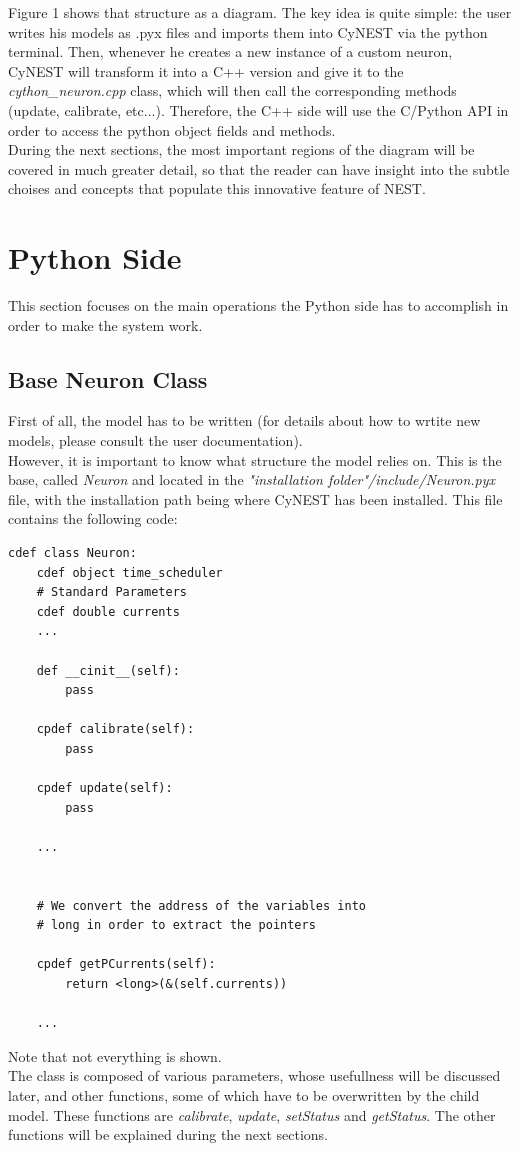 \documentclass{article}
\begin{document}
Figure 1 shows that structure as a diagram. The key idea is quite simple: the user writes his models as .pyx files and imports them into CyNEST via the python terminal. Then, whenever he creates a new instance of a custom neuron, CyNEST will transform it into a C++ version and give it to the \emph{cython\_neuron.cpp} class, which will then call the corresponding methods (update, calibrate, etc...). Therefore, the C++ side will use the C/Python API in order to access the python object fields and methods.\\

During the next sections, the most important regions of the diagram will be covered in much greater detail, so that the reader can have insight into the subtle choises and concepts that populate this innovative feature of NEST.



\section{Python Side}
This section focuses on the main operations the Python side has to accomplish in order to make the system work.\\

\subsection{Base Neuron Class}
First of all, the model has to be written (for details about how to wrtite new models, please consult the user documentation).\\
However, it is important to know what structure the model relies on. This is the base, called \emph{Neuron} and located in the \emph{"installation folder"/include/Neuron.pyx} file, with the installation path being where CyNEST has been installed. This file contains the following code:
\begin{verbatim}
cdef class Neuron:
    cdef object time_scheduler
    # Standard Parameters
    cdef double currents
    ...
    
    def __cinit__(self):
        pass

    cpdef calibrate(self):
        pass
        
    cpdef update(self):
        pass
        
    ...

       
    # We convert the address of the variables into 
    # long in order to extract the pointers

    cpdef getPCurrents(self):
        return <long>(&(self.currents))
        
    ...
\end{verbatim}
Note that not everything is shown.\\
The class is composed of various parameters, whose usefullness will be discussed later, and  other functions, some of which have to be overwritten by the child model. These functions are \emph{calibrate}, \emph{update}, \emph{setStatus} and \emph{getStatus}. The other functions will be explained during the next sections.
\end{document}
